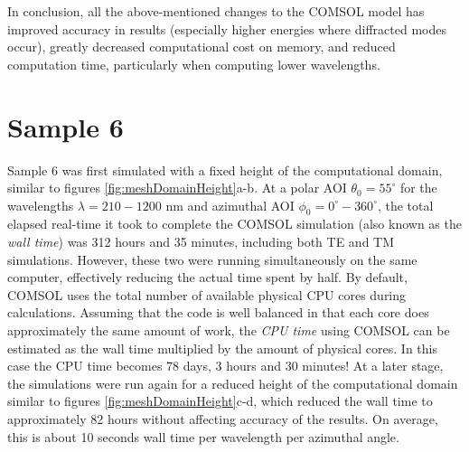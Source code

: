 In conclusion, all the above-mentioned changes to the COMSOL model has improved accuracy in results (especially higher energies where diffracted modes occur), greatly decreased  computational cost on memory, and reduced computation time, particularly when computing lower wavelengths.






\section{Sample 6}
Sample 6 was first simulated with a fixed height of the computational domain, similar to figures \ref{fig:meshDomainHeight}a-b. At a polar AOI $\theta_0=55^\circ$ for the wavelengths $\lambda=210-1200$ nm and azimuthal AOI $\phi_0=0^\circ-360^\circ$, the total elapsed real-time it took to complete the COMSOL simulation (also known as the \emph{wall time}) was 312 hours and 35 minutes, including both TE and TM simulations. However, these two were running simultaneously on the same computer, effectively reducing the actual time spent by half. By default, COMSOL uses the total number of available physical CPU cores during calculations. Assuming that the code is well balanced in that each core does approximately the same amount of work, the \emph{CPU time} using COMSOL can be estimated as the wall time multiplied by the amount of physical cores. In this case the CPU time becomes 78 days, 3 hours and 30 minutes! At a later stage, the simulations were run again for a reduced height of the computational domain similar to figures \ref{fig:meshDomainHeight}c-d, which reduced the wall time to approximately 82 hours without affecting accuracy of the results. On average, this is about 10 seconds wall time per wavelength per azimuthal angle.

